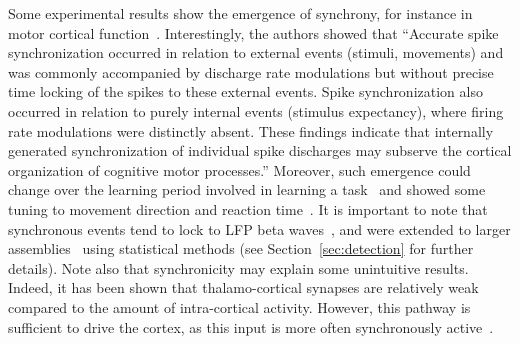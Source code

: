 \documentclass[brainsci, %
               review,submit,pdftex,moreauthors
               ]{Definitions/mdpi}
\begin{document}
Some experimental results show the emergence of synchrony, for instance in motor cortical function~\citep{riehle_spike_1997}. Interestingly, the authors showed that ``Accurate spike synchronization occurred in relation to external events (stimuli, movements) and was commonly accompanied by discharge rate modulations but without precise time locking of the spikes to these external events. Spike synchronization also occurred in relation to purely internal events (stimulus expectancy), where firing rate modulations were distinctly absent. These findings indicate that internally generated synchronization of individual spike discharges may subserve the cortical organization of cognitive motor processes.'' Moreover, such emergence could change over the learning period involved in learning a task~\citep{kilavik_long-term_2009} and showed some tuning to movement direction and reaction time~\citep{grammont_spike_2003}. It is important to note that synchronous events tend to lock to LFP beta waves~\citep{denker_lfp_2018}, and were extended to larger assemblies~\citep{torre_synchronous_2016, torre_asset_2016} using statistical methods (see Section~\ref{sec:detection} for further details). Note also that synchronicity may explain some unintuitive results. Indeed, it has been shown that thalamo-cortical synapses are relatively weak compared to the amount of intra-cortical activity. However, this pathway is sufficient to drive the cortex, as this input is more often synchronously active~\citep{bruno_cortex_2006}. 
\end{document}
